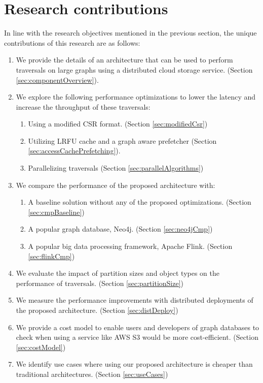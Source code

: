 \section{Research contributions}
In line with the research objectives mentioned in the previous section, the 
unique contributions of this research are as follows:
\begin{enumerate}
    \item We provide the details of an architecture that can be used to perform 
        traversals on large graphs using a distributed cloud storage service. 
        (Section \ref{sec:componentOverview}). 
    \item We explore the following performance optimizations to lower the latency and
        increase the throughput of these traversals:
        \begin{enumerate}
            \item Using a modified CSR format. (Section \ref{sec:modifiedCsr})
            \item Utilizing LRFU cache and a graph aware prefetcher 
                (Section \ref{sec:accessCachePrefetching}).
            \item Parallelizing traversals (Section
                \ref{sec:parallelAlgorithms})
        \end{enumerate}
    \item We compare the performance of the proposed architecture with:
        \begin{enumerate}
            \item A baseline solution without any of the proposed optimizations.
                (Section \ref{sec:cmpBaseline})
            \item A popular graph database, Neo4j. (Section \ref{sec:neo4jCmp})
            \item A popular big data processing framework, Apache Flink.
                (Section \ref{sec:flinkCmp})
        \end{enumerate}
    \item We evaluate the impact of partition sizes and object types on the performance of
        traversals. (Section \ref{sec:partitionSize})
    \item We measure the performance improvements with distributed deployments
        of the proposed architecture. (Section \ref{sec:distDeploy})
    \item We provide a cost model to enable users and developers of graph
        databases to check when using a service like AWS S3 would be more
        cost-efficient. (Section \ref{sec:costModel})
    \item We identify use cases where using our proposed architecture is
        cheaper than traditional architectures. (Section \ref{sec:useCases})
\end{enumerate}


